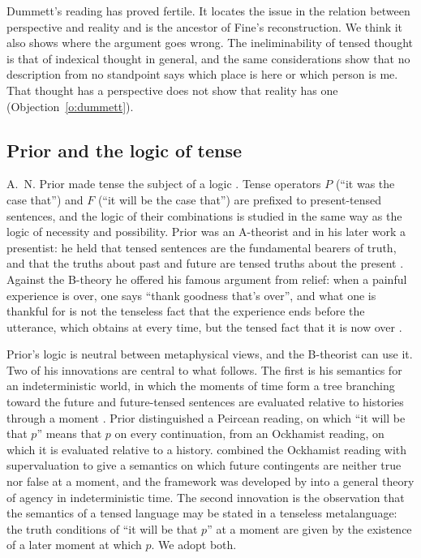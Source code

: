 \documentclass{situationist-preprint}
\begin{document}
Dummett's reading has proved fertile. It locates the issue in the relation between perspective and reality and is the ancestor of Fine's reconstruction. We think it also shows where the argument goes wrong. The ineliminability of tensed thought is that of indexical thought in general, and the same considerations show that no description from no standpoint says which place is here or which person is me. That thought has a perspective does not show that reality has one (Objection~\ref{o:dummett}).

\subsection{Prior and the logic of tense}

A.~N. Prior made tense the subject of a logic \citep{Prior1957,Prior1967}. Tense operators $P$ (\enquote{it was the case that}) and $F$ (\enquote{it will be the case that}) are prefixed to present-tensed sentences, and the logic of their combinations is studied in the same way as the logic of necessity and possibility. Prior was an A-theorist and in his later work a presentist: he held that tensed sentences are the fundamental bearers of truth, and that the truths about past and future are tensed truths about the present \citep{Prior1968}. Against the B-theory he offered his famous argument from relief: when a painful experience is over, one says \enquote{thank goodness that's over}, and what one is thankful for is not the tenseless fact that the experience ends before the utterance, which obtains at every time, but the tensed fact that it is now over \citep{Prior1959}.

Prior's logic is neutral between metaphysical views, and the B-theorist can use it. Two of his innovations are central to what follows. The first is his semantics for an indeterministic world, in which the moments of time form a tree branching toward the future and future-tensed sentences are evaluated relative to histories through a moment \citep{Prior1967}. Prior distinguished a Peircean reading, on which \enquote{it will be that $p$} means that $p$ on every continuation, from an Ockhamist reading, on which it is evaluated relative to a history. \citet{Thomason1970} combined the Ockhamist reading with supervaluation to give a semantics on which future contingents are neither true nor false at a moment, and the framework was developed by \citet{Belnap2001} into a general theory of agency in indeterministic time. The second innovation is the observation that the semantics of a tensed language may be stated in a tenseless metalanguage: the truth conditions of \enquote{it will be that $p$} at a moment are given by the existence of a later moment at which $p$. We adopt both.
\end{document}
